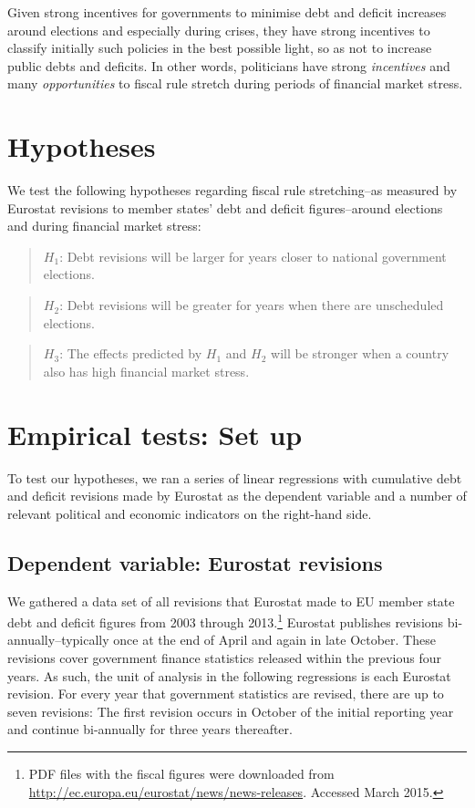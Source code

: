 \documentclass[]{article}
\begin{document}
Given strong incentives for governments to minimise debt and deficit increases around elections and especially during crises, they have strong incentives to  classify initially such policies in the best possible light, so as not to increase public debts and deficits. In other words, politicians have strong \emph{incentives} and many \emph{opportunities} to fiscal rule stretch during periods of financial market stress.

\section{Hypotheses}

We test the following hypotheses regarding fiscal rule stretching--as measured by Eurostat revisions to member states' debt and deficit figures--around elections and during financial market stress:

\begin{quote}
    $H_{1}$: Debt revisions will be larger for years closer to national government elections.
\end{quote}

\begin{quote}
    $H_{2}$: Debt revisions will be greater for years when there are unscheduled elections.
\end{quote}

\begin{quote}
    $H_{3}$: The effects predicted by $H_{1}$ and $H_{2}$ will be stronger when a country also has high financial market stress.
\end{quote}


\section{Empirical tests: Set up}

To test our hypotheses, we ran a series of linear regressions with cumulative debt and deficit revisions made by Eurostat as the dependent variable and a number of relevant political and economic indicators on the right-hand side.

\subsection{Dependent variable: Eurostat revisions}

We gathered a data set of all revisions that Eurostat made to EU member state debt and deficit figures from 2003 through 2013.\footnote{PDF files with the fiscal figures were downloaded from \url{http://ec.europa.eu/eurostat/news/news-releases}. Accessed March 2015.} Eurostat publishes revisions bi-annually--typically once at the end of April and again in late October. These revisions cover government finance statistics released within the previous four years. As such, the unit of analysis in the following regressions is each Eurostat revision. For every year that government statistics are revised, there are up to seven revisions: The first revision occurs in October of the initial reporting year and continue bi-annually for three years thereafter.
\end{document}

